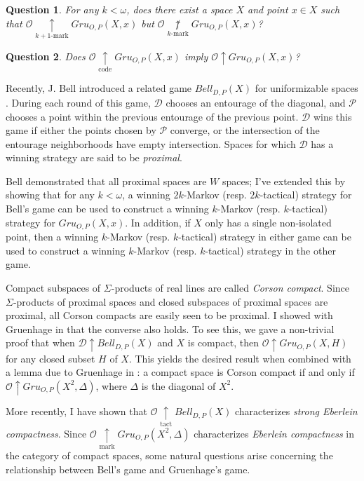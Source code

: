 \documentclass[11pt]{amsart}
\theoremstyle{plain}
\newtheorem{question}{Question}
\newcommand{\win}{\uparrow}
\newcommand{\markwin}{\underset{\text{mark}}{\uparrow}}
\newcommand{\tactwin}{\underset{\text{tact}}{\uparrow}}
\newcommand{\kmarkwin}[1]{\underset{#1\text{-mark}}{\uparrow}}
\newcommand{\codewin}{\underset{\text{code}}{\uparrow}}
\newcommand{\notkmarkwin}[1]{\underset{#1\text{-mark}}{\not\uparrow}}
\newcommand{\gruConGame}[2]{Gru_{O,P}(#1,#2)}
\newcommand{\bellConGame}[1]{Bell_{D,P}(#1)}
\newcommand{\<}{\langle}
\renewcommand{\>}{\rangle}
\newcommand{\pl}[1]{\mathscr{#1}}
\newcommand{\term}{\textit}
\begin{document}
\begin{question}
  For any $k<\omega$, does there exist a space $X$ and point $x\in X$ such that
  $\pl O\kmarkwin{k+1}\gruConGame{X}{x}$
  but $\pl O\notkmarkwin{k}\gruConGame{X}{x}$?
\end{question}

\begin{question}
  Does $\pl O\codewin\gruConGame{X}{x}$ imply $\pl O\win\gruConGame{X}{x}$?
\end{question}

Recently, J. Bell introduced a related game $\bellConGame{X}$ for uniformizable
spaces \cite{MR3239205}. During each round of this game, $\pl D$ chooses an
entourage of the diagonal, and $\pl P$ chooses a point within the previous
entourage of the previous point.
$\pl D$ wins this game if either the points chosen by $\pl P$ converge,
or the intersection of the entourage neighborhoods have empty intersection.
Spaces for which $\pl D$ has a winning strategy
are said to be \term{proximal}.

Bell demonstrated that all proximal spaces
are $W$ spaces; I've extended this by showing that for any $k<\omega$,
a winning $2k$-Markov (resp. $2k$-tactical) strategy for Bell's game can be
used to construct a winning $k$-Markov (resp. $k$-tactical) strategy for
$\gruConGame{X}{x}$. In addition, if $X$ only has a single non-isolated point,
then a winning $k$-Markov (resp. $k$-tactical) strategy in either game can be
used to construct a winning $k$-Markov (resp. $k$-tactical) strategy in the
other game.

Compact subspaces of $\Sigma$-products of real lines are called
\term{Corson compact}. Since $\Sigma$-products of proximal spaces and
closed subspaces of proximal spaces are proximal, all Corson compacts are
easily seen to be proximal. I showed with Gruenhage in \cite{MR3227201} that
the converse also holds. To see this, we gave a non-trivial proof that when
$\pl D\win\bellConGame{X}$ and $X$ is compact, then
$\pl O\win\gruConGame{X}{H}$ for any closed subset
$H$ of $X$. This yields the desired result when combined with a lemma due to
Gruenhage in \cite{MR752278}: a
compact space is Corson compact if and only if
$\pl O\win\gruConGame{X^2}{\Delta}$, where $\Delta$ is the diagonal of $X^2$.

More recently, I have shown that $\pl O\tactwin\bellConGame{X}$ characterizes
\term{strong Eberlein compactness}.
Since $\pl O\markwin\gruConGame{X^2}{\Delta}$ characterizes \term{Eberlein
compactness} in the category of compact spaces, some natural questions arise
concerning the relationship between Bell's game and Gruenhage's game.
\end{document}

